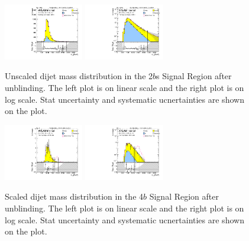 \begin{figure}[htbp!]
\begin{center}
\includegraphics[width=0.31\textwidth,angle=-90]{figures/boosted/Signal_Syst/Moriond_bkg_9_TwoTag_split_Signal_mHH_l.pdf}
\includegraphics[width=0.31\textwidth,angle=-90]{figures/boosted/Signal_Syst/Moriond_bkg_9_TwoTag_split_Signal_mHH_l_1.pdf}  
  \caption{Unscaled dijet mass distribution in the 2$b$s Signal Region after unblinding. The left plot is on linear scale and the right plot is on log scale. Stat uncertainty and systematic ucnertainties are shown on the plot.}
  \label{fig:boosted-2b-signal-l}
\end{center}
\end{figure}

\begin{figure}[htbp!]
\begin{center}
\includegraphics[width=0.31\textwidth,angle=-90]{figures/boosted/Signal_Syst/Moriond_bkg_9_FourTag_Signal_mHH_pole.pdf}
\includegraphics[width=0.31\textwidth,angle=-90]{figures/boosted/Signal_Syst/Moriond_bkg_9_FourTag_Signal_mHH_pole_1.pdf}
  \caption{Scaled dijet mass distribution in the 4$b$ Signal Region after unblinding. The left plot is on linear scale and the right plot is on log scale. Stat uncertainty and systematic ucnertainties are shown on the plot.}
  \label{fig:boosted-4b-signal-pole}
\end{center}
\end{figure}

